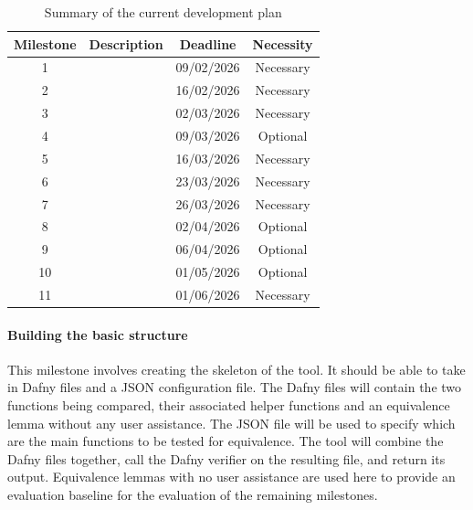 \begin{table}[ht]
  \centering
  \begin{tabular}{ |c|c|c|c| }
  \hline
  Milestone & Description & Deadline & Necessity \\
    \hline
    1 & \nameref{para:basic-structure} & 09/02/2026 & Necessary \\
    \hline
    2 & \nameref{para:ci-scripts} & 16/02/2026 & Necessary \\
    \hline
    3 & \nameref{para:parser} & 02/03/2026 & Necessary \\
    \hline
    4 & \nameref{para:variants} & 09/03/2026 & Optional \\
    \hline
    5 & \nameref{para:helper-axioms} & 16/03/2026 & Necessary \\
    \hline
    6 & \nameref{para:calling-lemmas-main} & 23/03/2026 & Necessary \\
    \hline
    7 & \nameref{para:calling-lemmas-helper} & 26/03/2026 & Necessary \\
    \hline
    8 & \nameref{para:multiple-solutions} & 02/04/2026 & Optional \\
    \hline
    9 & \nameref{para:auxiliary-axioms} & 06/04/2026 & Optional \\
    \hline
    10 & \nameref{para:higher-order} & 01/05/2026 & Optional \\
    \hline
    11 & \nameref{para:final-report-project} & 01/06/2026 & Necessary \\
    \hline
  \end{tabular}
  \caption{Summary of the current development plan}
\end{table}

\paragraph{Building the basic structure}\label{para:basic-structure} This milestone involves creating the skeleton of the tool. It should be able to take in Dafny files and a JSON configuration file. The Dafny files will contain the two functions being compared, their associated helper functions and an equivalence lemma without any user assistance. The JSON file will be used to specify which are the main functions to be tested for equivalence. The tool will combine the Dafny files together, call the Dafny verifier on the resulting file, and return its output. Equivalence lemmas with no user assistance are used here to provide an evaluation baseline for the evaluation of the remaining milestones. 

